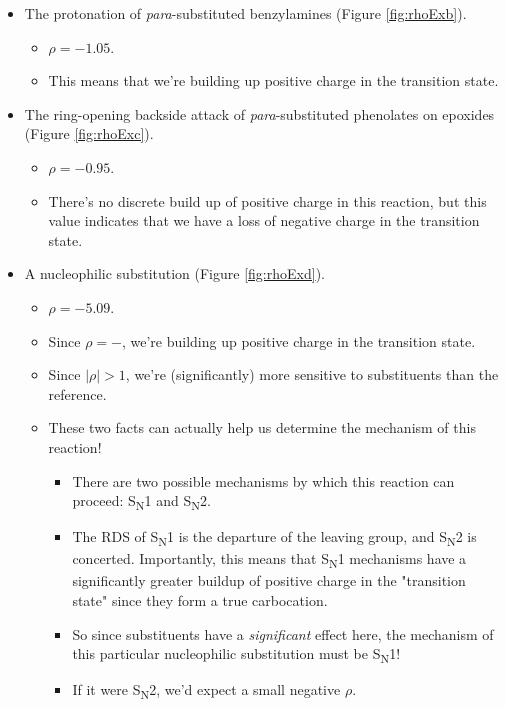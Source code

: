 \documentclass[../notes.tex]{subfiles}
\begin{document}
\begin{itemize}
\begin{itemize}
\begin{itemize}
        \end{itemize}
        \item The protonation of \emph{para}-substituted benzylamines (Figure \ref{fig:rhoExb}).
        \begin{itemize}
            \item $\rho=-1.05$.
            \item This means that we're building up positive charge in the transition state.
        \end{itemize}
        \item The ring-opening backside attack of \emph{para}-substituted phenolates on epoxides (Figure \ref{fig:rhoExc}).
        \begin{itemize}
            \item $\rho=-0.95$.
            \item There's no discrete build up of positive charge in this reaction, but this value indicates that we have a loss of negative charge in the transition state.
        \end{itemize}
        \item A nucleophilic substitution (Figure \ref{fig:rhoExd}).
        \begin{itemize}
            \item $\rho=-5.09$.
            \item Since $\rho=-$, we're building up positive charge in the transition state.
            \item Since $|\rho|>1$, we're (significantly) more sensitive to substituents than the reference.
            \item These two facts can actually help us determine the mechanism of this reaction!
            \begin{itemize}
                \item There are two possible mechanisms by which this reaction can proceed: S\textsubscript{N}1 and S\textsubscript{N}2.
                \item The RDS of S\textsubscript{N}1 is the departure of the leaving group, and S\textsubscript{N}2 is concerted. Importantly, this means that S\textsubscript{N}1 mechanisms have a significantly greater buildup of positive charge in the "transition state" since they form a true carbocation.
                \item So since substituents have a \emph{significant} effect here, the mechanism of this particular nucleophilic substitution must be S\textsubscript{N}1!
                \item If it were S\textsubscript{N}2, we'd expect a small negative $\rho$.

\end{itemize}
\end{itemize}
\end{itemize}
\end{itemize}
\end{document}
